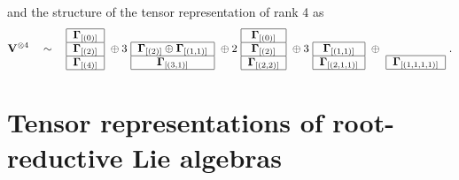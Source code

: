 \documentclass[12pt,reqno]{amsart}
\numberwithin{equation}{section}
\theoremstyle{plain}
\theoremstyle{definition}
\def\o{\otimes}
\def\soV_#1{\boldsymbol\Gamma_{[#1]}}
\def\VV{\mathbf V}
\begin{document}
and the structure of the tensor representation of rank 4 as
\begin{equation*}
    \VV^{\o4} \quad\sim\quad
        \begin{tabular}{|c|}
        \hline
        $\soV_{(0)}$\\
        \hline
        $\soV_{(2)}$\\
        \hline
        $\soV_{(4)}$\\
        \hline
    \end{tabular}
    \ \oplus 3 \
    \begin{tabular}{|c|}
        \multicolumn{1}{c}{ }\\
        \hline
        $\soV_{(2)} \oplus \soV_{(1,1)}$\\
        \hline
        $\soV_{(3,1)}$\\
        \hline
    \end{tabular}
    \ \oplus 2 \
    \begin{tabular}{|c|}
        \hline
        $\soV_{(0)}$\\
        \hline
        $\soV_{(2)}$\\
        \hline
        $\soV_{(2,2)}$\\
        \hline
    \end{tabular}
    \ \oplus 3 \
    \begin{tabular}{|c|}
        \multicolumn{1}{c}{ }\\
        \hline
        $\soV_{(1,1)}$\\
        \hline
        $\soV_{(2,1,1)}$\\
        \hline
    \end{tabular}
    \ \oplus \
    \begin{tabular}{|c|}
        \multicolumn{1}{c}{ }\\
        \multicolumn{1}{c}{ }\\
        \hline
        $\soV_{(1,1,1,1)}$\\
        \hline
    \end{tabular}\ .
\end{equation*}





\section{Tensor representations of root-reductive Lie algebras}

\end{document}
